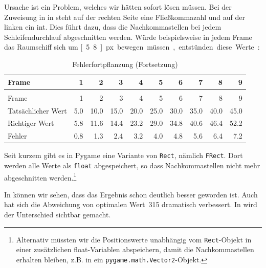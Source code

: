 Ursache ist ein Problem, welches wir hätten sofort lösen müssen. Bei der Zuweisung in  in  steht auf der rechten Seite eine Fließkommazahl und auf der linken ein \gls{int}. Dies führt dazu, dass die Nachkommastellen bei jedem Schleifendurchlauf abgeschnitten werden. Würde beispielsweise in jedem Frame das Raumschiff sich um \unit[5.8]{px} bewegen müssen, entstünden diese Werte:

\begin{longtable}{lrrrrrrrrr}
	\caption{Fehlerfortpflanzung}\label{tabFpsBewegung04} \\[1em]
    Frame & 1 & 2  & 3  & 4 & 5 &  6 & 7 & 8 & 9 \\[0.5em]\hline\hline
	\hline
	\endfirsthead %
	\caption{Fehlerfortpflanzung (Fortsetzung)}\\[1em]
    Frame & 1 & 2  & 3  & 4 & 5 &  6 & 7 & 8 & 9 \\[0.5em]\hline\hline
	\hline
	\endhead %
	Tatsächlicher Wert  & 5.0 & 10.0 & 15.0 & 20.0 & 25.0 & 30.0 & 35.0 & 40.0 & 45.0 \\ \hline
	Richtiger Wert      & 5.8 & 11.6 & 14.4 & 23.2 & 29.0 & 34.8 & 40.6 & 46.4 & 52.2 \\ \hline
	Fehler              & 0.8 & 1.3 & 2.4 & 3.2 & 4.0 & 4.8 & 5.6 & 6.4 & 7.2 \\ \hline
\end{longtable} 

Seit kurzem gibt es in Pygame eine Variante von \texttt{Rect}, nämlich \texttt{FRect}. Dort werden alle Werte als \texttt{float} abgespeichert, so dass Nachkommastellen nicht mehr abgeschnitten werden.\footnote{Alternativ müssten wir die Positionswerte unabhängig vom \texttt{Rect}-Objekt in einer zusätzlichen float-Variablen abspeichern, damit die Nachkommastellen erhalten bleiben, z.B. in ein \texttt{pygame.math.Vector2}-Objekt.} 

\newpage


In   können wir sehen, dass das Ergebnis schon deutlich besser geworden ist. Auch hat sich die Abweichung von optimalen Wert~315 dramatisch verbessert. In  wird der Unterschied sichtbar gemacht.

